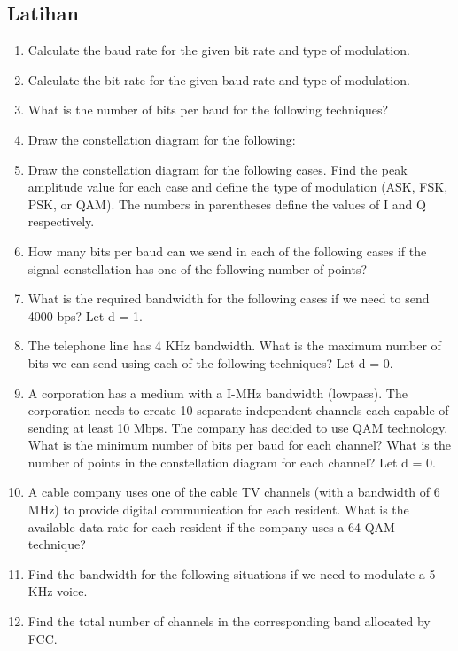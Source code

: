 \subsection*{Latihan}
\begin{enumerate}[resume]
  \item Calculate the baud rate for the given bit rate and type of modulation.
  \item Calculate the bit rate for the given baud rate and type of modulation.
  \item What is the number of bits per baud for the following techniques?
  \item Draw the constellation diagram for the following:
  \item Draw the constellation diagram for the following cases. Find the peak amplitude value for each case and define the type of modulation (ASK, FSK, PSK, or QAM). The numbers in parentheses define the values of I and Q respectively.
  \item How many bits per baud can we send in each of the following cases if the signal constellation has one of the following number of points?
  \item What is the required bandwidth for the following cases if we need to send 4000 bps? Let d = 1.
  \item The telephone line has 4 KHz bandwidth. What is the maximum number of bits we can send using each of the following techniques? Let d = 0.
  \item A corporation has a medium with a I-MHz bandwidth (lowpass). The corporation needs to create 10 separate independent channels each capable of sending at least 10 Mbps. The company has decided to use QAM technology. What is the minimum number of bits per baud for each channel? What is the number of points in the constellation diagram for each channel? Let d = 0.
  \item A cable company uses one of the cable TV channels (with a bandwidth of 6 MHz) to provide digital communication for each resident. What is the available data rate for each resident if the company uses a 64-QAM technique?
  \item Find the bandwidth for the following situations if we need to modulate a 5-KHz voice.
  \item Find the total number of channels in the corresponding band allocated by FCC.
\end{enumerate}